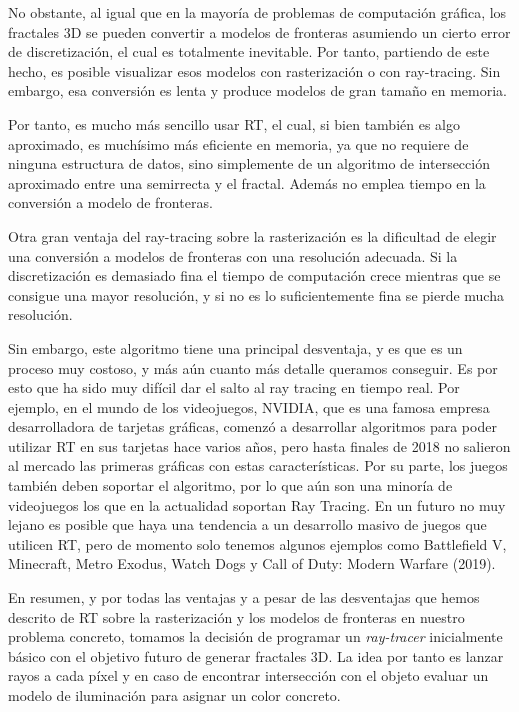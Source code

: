 No obstante, al igual que en la mayoría de problemas de computación gráfica, los fractales 3D se pueden convertir a modelos de fronteras asumiendo un cierto error de discretización, el cual es totalmente inevitable. Por tanto, partiendo de este hecho, es posible visualizar esos modelos con rasterización o con ray-tracing. Sin embargo, esa conversión es lenta y produce modelos de gran tamaño en memoria. 

Por tanto, es mucho más sencillo usar RT, el cual, si bien también es algo aproximado, es muchísimo más eficiente en memoria, ya que no requiere de ninguna estructura de datos, sino simplemente de un algoritmo de intersección aproximado entre una semirrecta y el fractal. Además no emplea tiempo en la conversión a modelo de fronteras. 

Otra gran ventaja del ray-tracing sobre la rasterización es la dificultad de elegir una conversión a modelos de fronteras con una resolución adecuada. Si la discretización es demasiado fina el tiempo de computación crece mientras que se consigue una mayor resolución, y si no es lo suficientemente fina se pierde mucha resolución.

Sin embargo, este algoritmo tiene una principal desventaja, y es que es un proceso muy costoso, y más aún cuanto más detalle queramos conseguir. Es por esto que ha sido muy difícil dar el salto al ray tracing en tiempo real. Por ejemplo, en el mundo de los videojuegos, NVIDIA, que es una famosa empresa desarrolladora de tarjetas gráficas, comenzó a desarrollar algoritmos para poder utilizar RT en sus tarjetas hace varios años, pero hasta finales de 2018 no salieron al mercado las primeras gráficas con estas características. Por su parte, los juegos también deben soportar el algoritmo, por lo que aún son una minoría de videojuegos los que en la actualidad soportan Ray Tracing. En un futuro no muy lejano es posible que haya una tendencia a un desarrollo masivo de juegos que utilicen RT, pero de momento solo tenemos algunos ejemplos como Battlefield V, Minecraft, Metro Exodus, Watch Dogs y Call of Duty: Modern Warfare (2019).

En resumen, y por todas las ventajas y a pesar de las desventajas que hemos descrito de RT sobre la rasterización y los modelos de fronteras en nuestro problema concreto, tomamos la decisión de programar un \textit{ray-tracer} inicialmente básico con el objetivo futuro de generar fractales 3D. La idea por tanto es lanzar rayos a cada píxel y en caso de encontrar intersección con el objeto evaluar un modelo de iluminación para asignar un color concreto.

